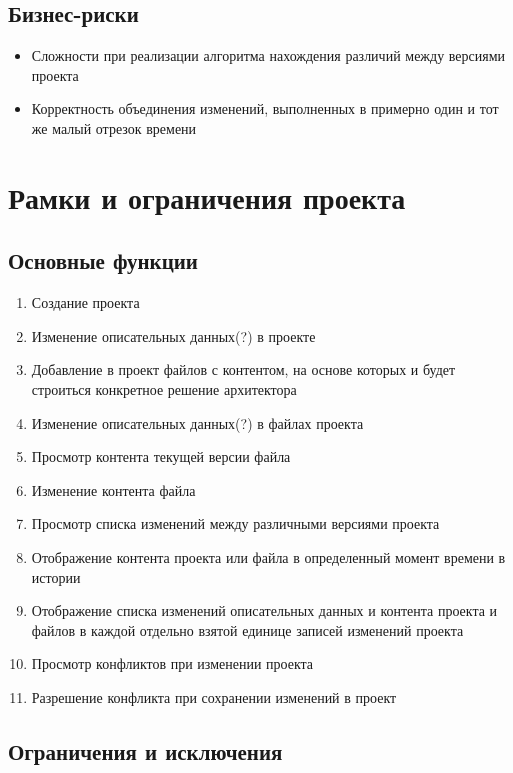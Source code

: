 \documentclass[a4paper,14pt]{extreport} %
\begin{document}
\subsection{Бизнес-риски}
 
\begin{itemize}
\item Сложности при реализации алгоритма нахождения различий между версиями проекта
\item Корректность объединения изменений, выполненных  в примерно один и тот же малый отрезок времени
\end {itemize}

\newpage

\section{Рамки и ограничения проекта}
\subsection{Основные функции}

\begin{enumerate}
\item Создание проекта
\item Изменение описательных данных(?) в проекте
\item Добавление в проект файлов с контентом, на основе которых и будет строиться конкретное решение архитектора
\item Изменение описательных данных(?) в файлах проекта
\item Просмотр контента текущей версии файла
\item Изменение контента файла
\item Просмотр списка изменений между различными версиями проекта
\item Отображение контента проекта или файла в определенный момент времени в истории
\item Отображение списка изменений описательных данных и контента проекта и файлов в каждой отдельно взятой единице записей изменений проекта
\item Просмотр конфликтов при изменении проекта
\item Разрешение конфликта при сохранении изменений в проект
\end {enumerate}

\subsection{Ограничения и исключения}
\end{document}
